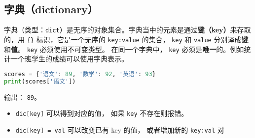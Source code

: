 \subsection{字典（dictionary）}
字典（类型：\verb`dict`）是无序的对象集合。字典当中的元素是通过\textbf{键（key）}来存取的，用 \verb`{}` 标识，它是一个无序的 \verb`key:value` 的集合， \verb`key` 和 \verb`value` 分别译成\textbf{键}和\textbf{值}。 \verb`key` 必须使用不可变类型。 在同一个字典中， \verb`key` 必须是\textbf{唯一}的。例如统计一个班学生的成绩可以使用字典表示。
\begin{lstlisting}[language=python]
scores = {'语文': 89, '数学': 92, '英语': 93}
print(scores['语文'])
\end{lstlisting}
输出： \verb`89`。

\begin{itemize}
\item \verb`dic[key]` 可以得到对应的值， 如果 \verb`key` 不存在则报错。
\item \verb`dic[key] = val` 可以改变已有 key 的值， 或者增加新的 \verb`key:val` 对
\end{itemize}
